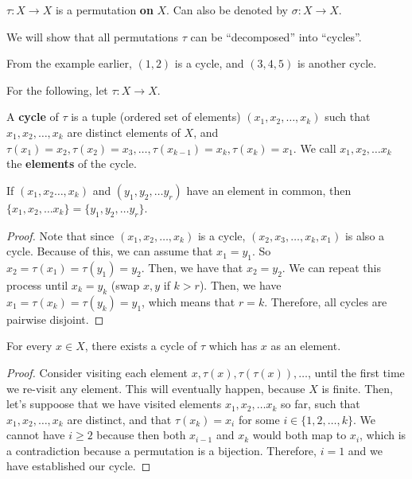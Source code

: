 
\begin{notation}
	\( \tau : X \to X \) is a permutation \textbf{on} \( X \). Can also be denoted by \( \sigma : X \to X \).
\end{notation}

We will show that all permutations \( \tau  \) can be ``decomposed'' into ``cycles''.

\begin{eg}
	From the example earlier, \( (1,2) \) is a cycle, and \( (3,4,5) \) is another cycle.
\end{eg}

For the following, let \( \tau : X \to X \).

\begin{definition}
	A \textbf{cycle} of \( \tau  \) is a tuple (ordered set of elements) \( (x_{1},x_{2},\ldots ,x_k) \) such that \( x_{1},x_{2},\ldots ,x_k \) are distinct elements of \( X \), and \( \tau (x_{1})=x_{2}, \tau (x_{2})=x_{3},\ldots,\tau (x_{k-1})=x_k, \tau (x_k)=x_{1}  \). We call \( x_{1},x_{2},\ldots x_k \) the \textbf{elements} of the cycle.
\end{definition}

\begin{lemma}
	If \( (x_{1},x_{2}\ldots ,x_k) \) and \( (y_{1},y_{2},\ldots y_r) \) have an element in common, then \( \{x_{1},x_{2},\ldots x_k\} =\{y_{1},y_{2},\ldots y_r\}    \).
\end{lemma}
\begin{proof}
	Note that since \( (x_{1},x_{2},\ldots ,x_k) \) is a cycle, \( (x_{2},x_{3},\ldots ,x_k,x_1) \) is also a cycle. Because of this, we can assume that \( x_{1}=y_{1} \). So \( x_{2}=\tau (x_{1})=\tau (y_{1})=y_{2} \).  Then, we have that \( x_{2}=y_{2} \). We can repeat this process until \( x_k=y_k \) (swap \( x,y \) if \( k > r \)). Then, we have \( x_{1}=\tau (x_k)=\tau (y_k)=y_{1} \), which means that \( r=k \). Therefore, all cycles are pairwise disjoint.
\end{proof}

\begin{lemma}
	For every \( x \in X \), there exists a cycle of \( \tau  \) which has \( x \) as an element.
\end{lemma}
\begin{proof}
	Consider visiting each element \( x,\tau (x), \tau (\tau (x)), \ldots  \), until the first time we re-visit any element. This will eventually happen, because \( X \) is finite. Then, let's suppoose that we have visited elements \( x_{1},x_{2},\ldots x_k \) so far, such that \( x_{1},x_{2},\ldots ,x_k \) are distinct, and that \( \tau (x_k)=x_i \) for some \( i \in \{1,2,\ldots ,k\}   \). We cannot have \( i\ge 2 \) because then both \( x_{i-1} \) and \( x_k \) would both map to \( x_i \), which is a contradiction because a permutation is a bijection. Therefore, \( i=1 \) and we have established our cycle.
\end{proof}
